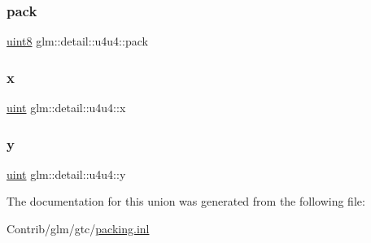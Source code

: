 \subsubsection{\texorpdfstring{pack}{pack}}
{\footnotesize\ttfamily \mbox{\hyperlink{namespaceglm_1_1detail_aef2588f97d090cc19fbbe0c74fe17c8f}{uint8}} glm\+::detail\+::u4u4\+::pack}

\mbox{\label{unionglm_1_1detail_1_1u4u4_a488b94e524db2319dd7801ef632ef7f1}} 
\subsubsection{\texorpdfstring{x}{x}}
{\footnotesize\ttfamily \mbox{\hyperlink{group__core__precision_ga4fd29415871152bfb5abd588334147c8}{uint}} glm\+::detail\+::u4u4\+::x}

\mbox{\label{unionglm_1_1detail_1_1u4u4_a397ae8c3903b0fd4fe9c88617607f7af}} 
\subsubsection{\texorpdfstring{y}{y}}
{\footnotesize\ttfamily \mbox{\hyperlink{group__core__precision_ga4fd29415871152bfb5abd588334147c8}{uint}} glm\+::detail\+::u4u4\+::y}



The documentation for this union was generated from the following file\+:\begin{DoxyCompactItemize}
\item 
Contrib/glm/gtc/\mbox{\hyperlink{packing_8inl}{packing.\+inl}}\end{DoxyCompactItemize}
